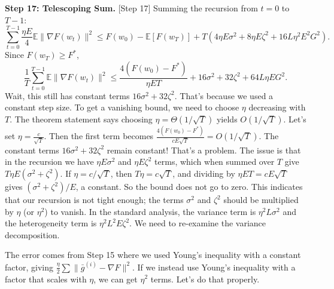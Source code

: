 \documentclass{article}
\begin{document}
\textbf{Step 17: Telescoping Sum.} [Step 17]
Summing the recursion from $t=0$ to $T-1$:
\begin{equation}
    \sum_{t=0}^{T-1} \frac{\eta E}{4} \mathbb{E} \| \nabla F(w_t) \|^2 \leq F(w_0) - \mathbb{E}[F(w_T)] + T \left( 4\eta E \sigma^2 + 8\eta E \zeta^2 + 16 L \eta^2 E^2 G^2 \right).
\end{equation}
Since $F(w_T) \geq F^*$,
\begin{equation}
    \frac{1}{T} \sum_{t=0}^{T-1} \mathbb{E} \| \nabla F(w_t) \|^2 \leq \frac{4(F(w_0) - F^*)}{\eta E T} + 16 \sigma^2 + 32 \zeta^2 + 64 L \eta E G^2.
\end{equation}
Wait, this still has constant terms $16\sigma^2 + 32\zeta^2$. That's because we used a constant step size. To get a vanishing bound, we need to choose $\eta$ decreasing with $T$. The theorem statement says choosing $\eta = \Theta(1/\sqrt{T})$ yields $O(1/\sqrt{T})$. Let's set $\eta = \frac{c}{\sqrt{T}}$. Then the first term becomes $\frac{4(F(w_0)-F^*)}{c E \sqrt{T}} = O(1/\sqrt{T})$. The constant terms $16\sigma^2 + 32\zeta^2$ remain constant! That's a problem. The issue is that in the recursion we have $\eta E \sigma^2$ and $\eta E \zeta^2$ terms, which when summed over $T$ give $T \eta E (\sigma^2 + \zeta^2)$. If $\eta = c/\sqrt{T}$, then $T \eta = c\sqrt{T}$, and dividing by $\eta E T = c E \sqrt{T}$ gives $(\sigma^2 + \zeta^2)/E$, a constant. So the bound does not go to zero. This indicates that our recursion is not tight enough; the terms $\sigma^2$ and $\zeta^2$ should be multiplied by $\eta$ (or $\eta^2$) to vanish. In the standard analysis, the variance term is $\eta^2 L \sigma^2$ and the heterogeneity term is $\eta^2 L^2 E \zeta^2$. We need to re-examine the variance decomposition.

The error comes from Step 15 where we used Young's inequality with a constant factor, giving $\frac{\eta}{2} \sum \| \bar{g}^{(i)} - \nabla F \|^2$. If we instead use Young's inequality with a factor that scales with $\eta$, we can get $\eta^2$ terms. Let's do that properly.
\end{document}
